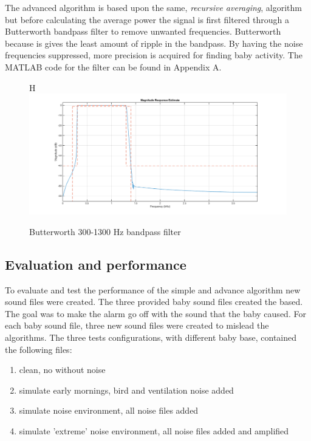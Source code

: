 The advanced algorithm is based upon the same, \emph{recursive averaging}, algorithm but before calculating
the average power the signal is first filtered through a Butterworth bandpass filter to remove unwanted 
frequencies. Butterworth because is gives the least amount of ripple in the bandpass. By having the noise frequencies suppressed, 
more precision is acquired for finding baby activity. The MATLAB code for the filter can be found in Appendix A.

\begin{figure}{H}
  \centering
  \includegraphics[width=1\textwidth]{sections/butt_pass_est.png}
  \caption{Butterworth 300-1300 Hz bandpass filter}
  \label{fig:butt_pass}
\end{figure}

\subsection{Evaluation and performance}
To evaluate and test the performance of the simple and advance algorithm new sound files were created. The three provided
baby sound files created the based. The goal was to make the alarm go off with the sound that the baby caused. 
For each baby sound file, three new sound files were created to mislead the algorithms.
The three tests configurations, with different baby base, contained the following files:

\begin{enumerate}
  \item clean, no without noise
  \item simulate early mornings, bird and ventilation noise added
  \item simulate noise environment, all noise files added
  \item simulate 'extreme' noise environment, all noise files added and amplified
\end{enumerate}


